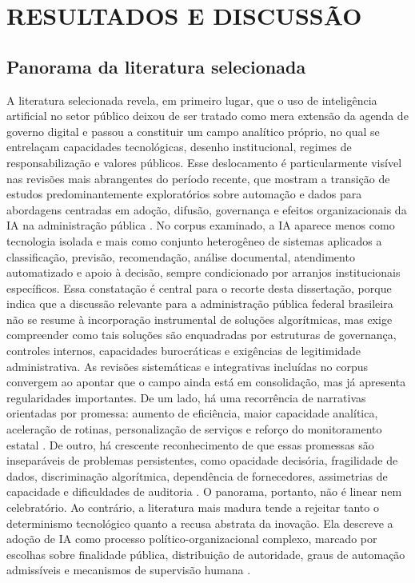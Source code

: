 \documentclass[12pt,a4paper]{article}
\begin{document}
\section{RESULTADOS E DISCUSSÃO}
\label{sec:org18503ae}
\subsection{Panorama da literatura selecionada}
\label{sec:orga17e527}
A literatura selecionada revela, em primeiro lugar, que o uso de inteligência artificial no setor público deixou de ser tratado como mera extensão da agenda de governo digital e passou a constituir um campo analítico próprio, no qual se entrelaçam capacidades tecnológicas, desenho institucional, regimes de responsabilização e valores públicos. Esse deslocamento é particularmente visível nas revisões mais abrangentes do período recente, que mostram a transição de estudos predominantemente exploratórios sobre automação e dados para abordagens centradas em adoção, difusão, governança e efeitos organizacionais da IA na administração pública \autocite{madan2022ai} \autocite{serra2024a} \autocite{lyrio2025emerging}. No corpus examinado, a IA aparece menos como tecnologia isolada e mais como conjunto heterogêneo de sistemas aplicados a classificação, previsão, recomendação, análise documental, atendimento automatizado e apoio à decisão, sempre condicionado por arranjos institucionais específicos. Essa constatação é central para o recorte desta dissertação, porque indica que a discussão relevante para a administração pública federal brasileira não se resume à incorporação instrumental de soluções algorítmicas, mas exige compreender como tais soluções são enquadradas por estruturas de governança, controles internos, capacidades burocráticas e exigências de legitimidade administrativa.
As revisões sistemáticas e integrativas incluídas no corpus convergem ao apontar que o campo ainda está em consolidação, mas já apresenta regularidades importantes. De um lado, há uma recorrência de narrativas orientadas por promessa: aumento de eficiência, maior capacidade analítica, aceleração de rotinas, personalização de serviços e reforço do monitoramento estatal \autocite{alhosani2024opportunities} \autocite{pi2021machine}. De outro, há crescente reconhecimento de que essas promessas são inseparáveis de problemas persistentes, como opacidade decisória, fragilidade de dados, discriminação algorítmica, dependência de fornecedores, assimetrias de capacidade e dificuldades de auditoria \autocite{batool2025ai} \autocite{sigfrids2022how} \autocite{mkander2023auditing}. O panorama, portanto, não é linear nem celebratório. Ao contrário, a literatura mais madura tende a rejeitar tanto o determinismo tecnológico quanto a recusa abstrata da inovação. Ela descreve a adoção de IA como processo político-organizacional complexo, marcado por escolhas sobre finalidade pública, distribuição de autoridade, graus de automação admissíveis e mecanismos de supervisão humana \autocite{criado2024artificial} \autocite{parycek2023artificial}.
\end{document}

